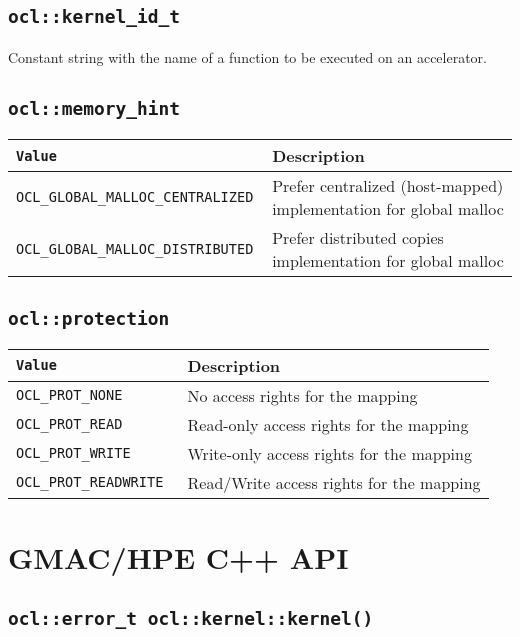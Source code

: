 \subsection{\texttt{ocl::kernel\_id\_t}}

Constant string with the name of a function to be executed on an accelerator.

\subsection{\texttt{ocl::memory\_hint}}

\begin{tabularx}{\linewidth}{|>{\texttt\bgroup}l<{\egroup}|X|}
  \hline
  \textnormal{Value} & Description \\
  \hline
  \hline
  OCL\_GLOBAL\_MALLOC\_CENTRALIZED & Prefer centralized (host\hyp{}mapped) implementation for global 
  malloc \\
  OCL\_GLOBAL\_MALLOC\_DISTRIBUTED & Prefer distributed copies implementation for global malloc \\
  \hline
\end{tabularx}


\subsection{\texttt{ocl::protection}}

\begin{tabularx}{\linewidth}{|>{\texttt\bgroup}l<{\egroup}|X|}
  \hline
  \textnormal{Value} & Description \\
  \hline
  \hline
  OCL\_PROT\_NONE  & No access rights for the mapping \\
  OCL\_PROT\_READ  & Read\hyp{}only access rights for the mapping \\
  OCL\_PROT\_WRITE & Write\hyp{}only access rights for the mapping \\
  OCL\_PROT\_READWRITE & Read\slash{}Write access rights for the mapping \\
  \hline
\end{tabularx}

\section{GMAC\slash HPE C++ API}

\subsection{\texttt{ocl::error\_t ocl::kernel::kernel()}}

